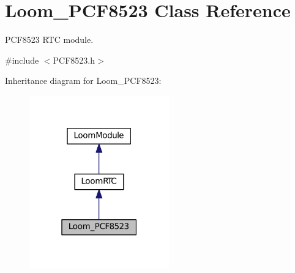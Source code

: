 \hypertarget{class_loom___p_c_f8523}{}\section{Loom\+\_\+\+P\+C\+F8523 Class Reference}
\label{class_loom___p_c_f8523}


P\+C\+F8523 R\+TC module.  




{\ttfamily \#include $<$P\+C\+F8523.\+h$>$}



Inheritance diagram for Loom\+\_\+\+P\+C\+F8523\+:\nopagebreak
\begin{figure}[H]
\begin{center}
\leavevmode
\includegraphics[width=171pt]{class_loom___p_c_f8523__inherit__graph}
\end{center}
\end{figure}
